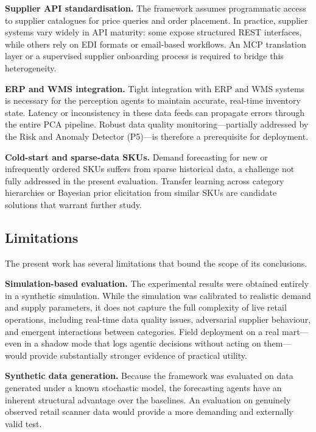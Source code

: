 \documentclass[utf8]{FrontiersinHarvard}
\begin{document}
	\textbf{Supplier API standardisation.}  The framework assumes programmatic
	access to supplier catalogues for price queries and order placement.  In
	practice, supplier systems vary widely in API maturity: some expose
	structured REST interfaces, while others rely on EDI formats or
	email-based workflows.  An MCP translation layer or a supervised supplier
	onboarding process is required to bridge this heterogeneity.

	\textbf{ERP and WMS integration.}  Tight integration with ERP and WMS
	systems is necessary for the perception agents to maintain accurate,
	real-time inventory state.  Latency or inconsistency in these data feeds
	can propagate errors through the entire PCA pipeline.  Robust data quality
	monitoring---partially addressed by the Risk and Anomaly Detector
	(P5)---is therefore a prerequisite for deployment.

	\textbf{Cold-start and sparse-data SKUs.}  Demand forecasting for new or
	infrequently ordered SKUs suffers from sparse historical data, a challenge
	not fully addressed in the present evaluation.  Transfer learning across
	category hierarchies or Bayesian prior elicitation from similar SKUs are
	candidate solutions that warrant further study.

	\subsection{Limitations}

	The present work has several limitations that bound the scope of its
	conclusions.

	\textbf{Simulation-based evaluation.}  The experimental results were
	obtained entirely in a synthetic simulation.  While the simulation was
	calibrated to realistic demand and supply parameters, it does not capture
	the full complexity of live retail operations, including real-time data
	quality issues, adversarial supplier behaviour, and emergent interactions
	between categories.  Field deployment on a real mart---even in a shadow
	mode that logs agentic decisions without acting on them---would provide
	substantially stronger evidence of practical utility.

	\textbf{Synthetic data generation.}  Because the framework was evaluated on
	data generated under a known stochastic model, the forecasting agents have
	an inherent structural advantage over the baselines.  An evaluation on
	genuinely observed retail scanner data would provide a more demanding and
	externally valid test.
\end{document}
